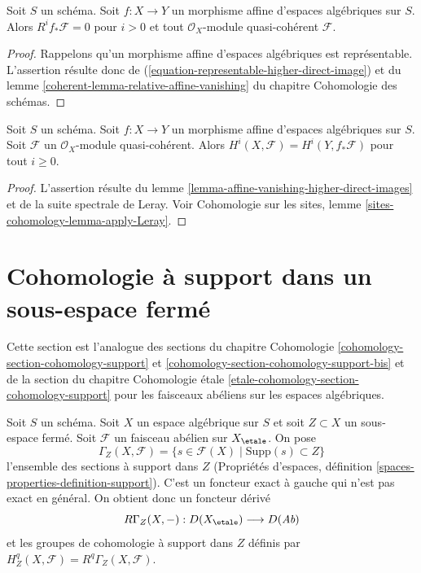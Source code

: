 \begin{lemma}
\label{lemma-affine-vanishing-higher-direct-images}
Soit $S$ un schéma. Soit $f : X \to Y$ un morphisme affine
d'espaces algébriques sur $S$. Alors
$R^if_*\mathcal{F} = 0$ pour $i > 0$ et tout
$\mathcal{O}_X$-module quasi-cohérent $\mathcal{F}$.
\end{lemma}

\begin{proof}
Rappelons qu'un morphisme affine d'espaces algébriques est représentable.
L'assertion résulte donc de (\ref{equation-representable-higher-direct-image}) et du
lemme \ref{coherent-lemma-relative-affine-vanishing} du chapitre Cohomologie des schémas.
\end{proof}

\begin{lemma}
\label{lemma-relative-affine-cohomology}
Soit $S$ un schéma. Soit $f : X \to Y$ un morphisme affine
d'espaces algébriques sur $S$.
Soit $\mathcal{F}$ un $\mathcal{O}_X$-module quasi-cohérent.
Alors $H^i(X, \mathcal{F}) = H^i(Y, f_*\mathcal{F})$ pour tout $i \geq 0$.
\end{lemma}

\begin{proof}
L'assertion résulte du lemme \ref{lemma-affine-vanishing-higher-direct-images}
et de la suite spectrale de Leray. Voir
Cohomologie sur les sites, lemme \ref{sites-cohomology-lemma-apply-Leray}.
\end{proof}






\section{Cohomologie à support dans un sous-espace fermé}
\label{section-cohomology-support}

\noindent
Cette section est l'analogue des sections du chapitre Cohomologie
\ref{cohomology-section-cohomology-support} et
\ref{cohomology-section-cohomology-support-bis}
et de la section du chapitre Cohomologie \'etale
\ref{etale-cohomology-section-cohomology-support}
pour les faisceaux abéliens sur les espaces algébriques.

\medskip\noindent
Soit $S$ un schéma.
Soit $X$ un espace algébrique sur $S$ et soit $Z \subset X$ un
sous-espace fermé. Soit $\mathcal{F}$ un faisceau abélien sur $X_\etale$. On pose
$$
\Gamma_Z(X, \mathcal{F}) =
\{s \in \mathcal{F}(X) \mid \text{Supp}(s) \subset Z\}
$$
l'ensemble des sections à support dans $Z$
(Propriétés d'espaces, définition \ref{spaces-properties-definition-support}).
C'est un foncteur exact à gauche qui n'est pas exact en général.
On obtient donc un foncteur dérivé
$$
R\Gamma_Z(X, -) : D(X_\etale) \longrightarrow D(\textit{Ab})
$$
et les groupes de cohomologie à support dans $Z$ définis par
$H^q_Z(X, \mathcal{F}) = R^q\Gamma_Z(X, \mathcal{F})$.

